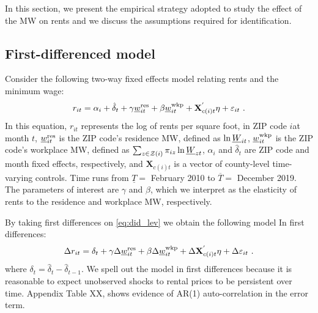 
In this section, we present the empirical strategy adopted to study the effect 
of the MW on rents and we discuss the assumptions required for identification.
    
\subsection{First-differenced model}

Consider the following two-way fixed effects model relating rents and the minimum wage:
\begin{equation*} \label{eq:did_lev}
    r_{it} = \alpha_i + \hat{\delta}_t 
           + \gamma \underline{w}^{\text{res}}_{it} + \beta \underline{w}^{\text{wkp}}_{it}
           + \mathbf{X}^{'}_{c(i)t}\eta
           + \varepsilon_{it} \ .
\end{equation*}    
In this equation, 
$r_{it}$ represents the log of rents per square foot, in ZIP code $i$at month $t$,
$\underline{w}^{\text{res}}_{it}$ is the ZIP code's residence MW, defined as $\ln \underline{W}_{it}$,
$\underline{w}^{\text{wkp}}_{it}$ is the ZIP code's workplace MW, defined as $\sum_{z\in\mathcal{Z}(i)} \pi_{iz}\ln \underline{W}_{zt}$,
$\alpha_i$ and $\hat{\delta}_t$ are ZIP code and month fixed effects, 
respectively, and 
$\mathbf{X}_{c(i)t}$ is a vector of county-level time-varying controls.
Time runs from $\underline{T} =$ February 2010 to $\overline{T} = $ December 2019.
The parameters of interest are $\gamma$ and $\beta$, which we interpret as the 
elasticity of rents to the residence and workplace MW, respectively.

By taking first differences on \ref{eq:did_lev} we obtain the following model In
first differences:
\begin{equation}\label{eq:fd}
    \Delta r_{it} = \delta_t 
                  + \gamma \Delta \underline{w}^{\text{res}}_{it} + \beta \Delta \underline{w}^{\text{wkp}}_{it}
                  + \Delta \mathbf{X}^{'}_{c(i)t}\eta
                  + \Delta \varepsilon_{it} \ .
\end{equation}
where $\delta_t = \hat{\delta}_t - \hat{\delta}_{t-1}$.
We spell out the model in first differences because it is reasonable to expect 
unobserved shocks to rental prices to be persistent over time. 
Appendix Table XX, shows evidence of AR(1) auto-correlation in the error term.

